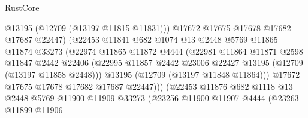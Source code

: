 \begin{lexlean}{RustCore}
\begin{coremodule}
                                    @13195
                                    (@12709 (@13197 @11815 @11831)))
                                  @17672
                                  @17675
                                  @17678
                                  @17682
                                  @17687
                                  @22447)
                                (@22453
                                  @11841
                                  @682
                                  @1074
                                  @13
                                  @2448
                                  @5769
                                  @11865
                                  @11874
                                  @33273
                                  (@22974
                                    @11865
                                    @11872
                                    @4444
                                    (@22981
                                      @11864
                                      @11871
                                      @2598
                                      @11847
                                      @2442
                                      @22406
                                      (@22995
                                        @11857
                                        @2442
                                        @23006
                                        @22427
                                        @13195
                                        (@12709 (@13197 @11858 @2448)))
                                      @13195
                                      (@12709 (@13197 @11848 @11864)))
                                    @17672
                                    @17675
                                    @17678
                                    @17682
                                    @17687
                                    @22447)))
                              (@22453
                                @11876
                                @682
                                @1118
                                @13
                                @2448
                                @5769
                                @11900
                                @11909
                                @33273
                                (@23256
                                  @11900
                                  @11907
                                  @4444
                                  (@23263
                                    @11899
                                    @11906

\end{coremodule}
\end{lexlean}
